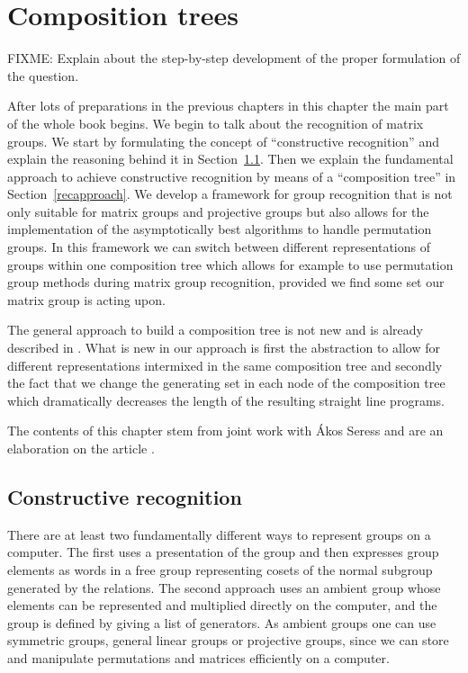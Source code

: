 
\chapter{Composition trees}

FIXME: Explain about the step-by-step development of the proper formulation
of the question.

After lots of preparations in the previous chapters
in this chapter the main part of the whole book begins. We begin to talk
about the recognition of matrix groups. We start by formulating
the concept of ``constructive recognition'' and explain the reasoning
behind it in Section~\ref{constrrecog}. Then we explain the fundamental
approach to achieve
constructive recognition by means of a ``composition tree'' in
Section~\ref{recapproach}. We develop a
framework for group recognition that is not only suitable for matrix
groups and projective groups but also allows for the implementation of
the asymptotically best algorithms to handle permutation groups. In
this framework we can switch between different representations of
groups within one composition tree which allows for example to use 
permutation group methods during matrix group recognition, provided
we find some set our matrix group is acting upon.

The general approach to build a composition tree is not new and is
already described in \cite{MatGrpProj}. What is new in our approach
is first the abstraction to allow for different representations
intermixed in the same composition tree and secondly the fact that
we change the generating set in each node of the composition tree
which dramatically decreases the length of the resulting straight
line programs. 

The contents of this chapter stem from joint work with \'Akos Seress
and are an elaboration on the article \cite{AkosMaxISSAC}.

\section{Constructive recognition}
\label{constrrecog}

There are at least two fundamentally different ways to represent groups on
a computer. The first uses a presentation of the group and then
expresses group elements as words in a free group representing
cosets of the normal subgroup generated by the relations. The second
approach uses an ambient group whose elements can be represented and
multiplied directly on the computer, and the group is defined by giving
a list of generators. As ambient groups one can use symmetric groups, general
linear groups or projective groups, since we can store and manipulate
permutations and matrices efficiently on a computer.

